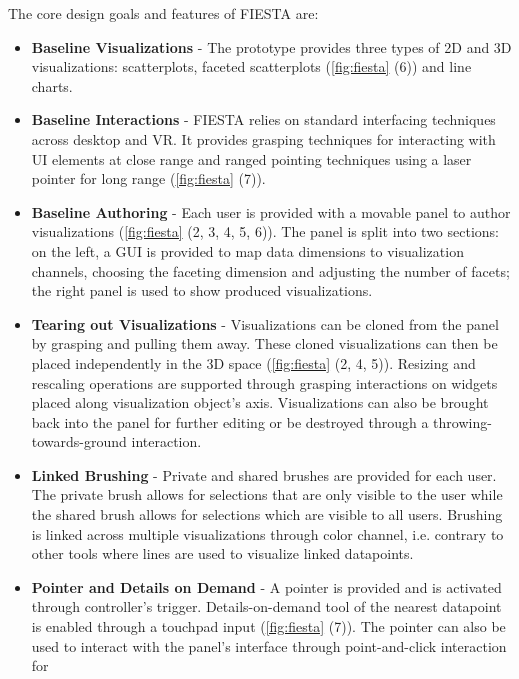 \documentclass{vgtc}                          %
\begin{document}
\medskip

\noindent The core design goals and features of FIESTA are:
\begin{itemize}
	\item \textbf{Baseline Visualizations} - The prototype provides three types
	      of 2D and 3D visualizations: scatterplots, faceted scatterplots
	      (\ref{fig:fiesta} (6)) and line charts.
	\item \textbf{Baseline Interactions} - FIESTA relies on standard
	      interfacing techniques across desktop and VR. It provides grasping
	      techniques for interacting with UI elements at close range and ranged
	      pointing techniques using a laser pointer for long range
	      (\ref{fig:fiesta} (7)).
	\item \textbf{Baseline Authoring} - Each user is provided with a movable
	      panel to author visualizations (\ref{fig:fiesta} (2, 3, 4, 5, 6)).
	      The panel is split into two sections: on the left, a GUI is provided
	      to map data dimensions to visualization channels, choosing the
	      faceting dimension and adjusting the number of facets; the right
	      panel is used to show produced visualizations.
	\item \textbf{Tearing out Visualizations} - Visualizations can be cloned
	      from the panel by grasping and pulling them away. These cloned
	      visualizations can then be placed independently in the 3D space
	      (\ref{fig:fiesta} (2, 4, 5)). Resizing and rescaling operations are
	      supported through grasping interactions on widgets placed along
	      visualization object's axis. Visualizations can also be brought back
	      into the panel for further editing or be destroyed through a
	      throwing-towards-ground interaction.
	\item \textbf{Linked Brushing} - Private and shared brushes are provided
	      for each user. The private brush allows for selections that are only
	      visible to the user while the shared brush allows for selections
	      which are visible to all users. Brushing is linked across multiple
	      visualizations through color channel, i.e. contrary to other tools
	      where lines are used to visualize linked datapoints.
	\item \textbf{Pointer and Details on Demand} - A pointer is provided and is
	      activated through controller's trigger. Details-on-demand tool of the
	      nearest datapoint is enabled through a touchpad input
	      (\ref{fig:fiesta} (7)). The pointer can also be used to interact
	      with the panel's interface through point-and-click interaction for

\end{itemize}
\end{document}
